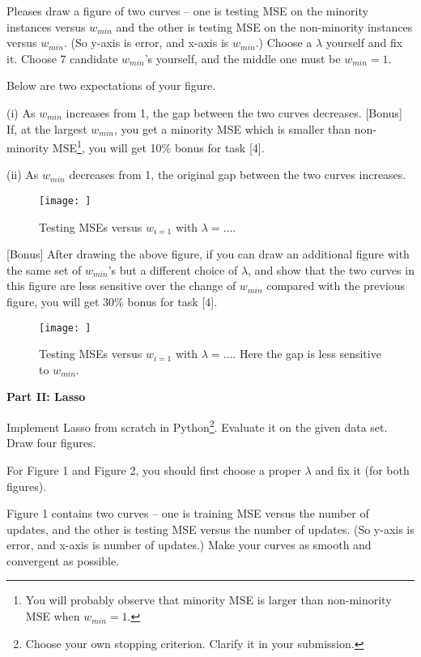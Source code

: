 \documentclass{llncs}
\begin{document}
Pleases draw a figure of two curves -- 
one is testing MSE on the minority instances 
versus $w_{min}$ and the other is testing MSE 
on the non-minority instances versus $w_{min}$. 
(So y-axis is error, and x-axis is $w_{min}$.) 
Choose a $\lambda$ yourself and fix it. 
Choose 7 candidate $w_{min}$'s yourself, 
and the middle one must be $w_{min} = 1$.  

Below are two expectations of your figure. 

(i) As $w_{min}$ increases from 1, 
the gap between the two curves decreases. 
[Bonus] If, at the largest $w_{min}$, 
you get a minority MSE which is smaller than
non-minority MSE\footnote{You 
will probably observe that minority MSE is larger 
than non-minority MSE when $w_{min} = 1$.}, 
you will get 10\% bonus for task [4]. 

(ii) As $w_{min}$ decreases from 1, 
the original gap between the two curves increases. 

\begin{figure}[h!] 
\centering 
\texttt{[image: ]} 
\caption{Testing MSEs versus $w_{i=1}$ 
with $\lambda = \ldots$.} 
\end{figure}

[Bonus] After drawing the above figure, 
if you can draw an additional figure 
with the same set of $w_{min}$'s but a 
different choice of $\lambda$, and show that 
the two curves in this figure are less sensitive 
over the change of $w_{min}$ compared with the 
previous figure, you will get 30\% bonus for task [4].

\begin{figure}[h!] 
\centering 
\texttt{[image: ]} 
\caption{Testing MSEs versus $w_{i=1}$ 
with $\lambda = \ldots$. Here the gap is 
less sensitive to $w_{min}$.} 
\end{figure}

\textbf{Part II: Lasso}

Implement Lasso from scratch in Python\footnote{Choose 
your own stopping criterion. Clarify it in your 
submission.}. 
Evaluate it on the given data set. 
Draw four figures. 

For Figure 1 and Figure 2, you should first choose 
a proper $\lambda$ and fix it (for both figures). 

Figure 1 contains two curves -- one is training MSE 
versus the number of updates, and the other is testing 
MSE versus the number of updates. (So y-axis is error, 
and x-axis is number of updates.) 
Make your curves as smooth and convergent as possible. 
\end{document}
